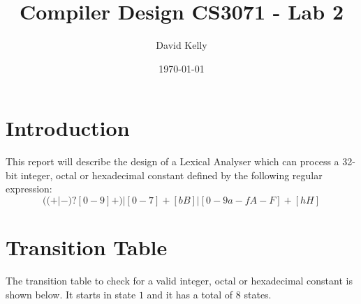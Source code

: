 \documentclass[11pt]{article}
\begin{document}
\begin{titlepage}
\title
{
Compiler Design CS3071 - Lab 2
}
\author{David Kelly}
\date{\today}
\maketitle

\thispagestyle{empty}

\end{titlepage}

\tableofcontents

\thispagestyle{empty}

\pagebreak

\setcounter{page}{1}

\section{Introduction}
This report will describe the design of a Lexical Analyser which can process a 32-bit integer, octal or hexadecimal constant defined by the following regular expression:
\begin{equation}
((+ | -)?[0-9]+) | [0-7]+[bB] | [0-9a-fA-F]+[hH]
\end{equation}

\section{Transition Table}
The transition table to check for a valid integer, octal or hexadecimal constant is shown below. It starts in state $1$ and it has a total of $8$ states.
\end{document}
